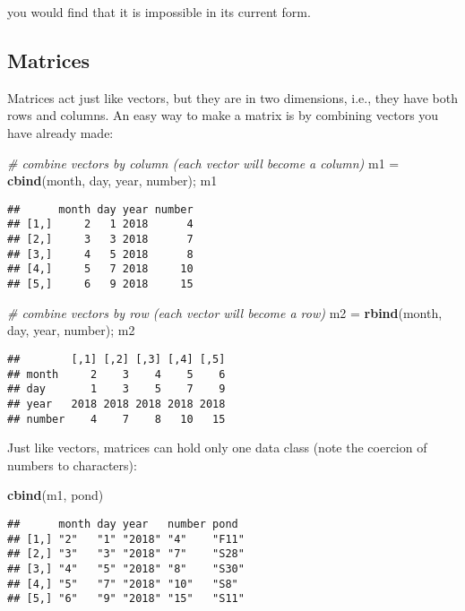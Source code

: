 \documentclass[]{book}
\newenvironment{Shaded}{\begin{snugshade}}{\end{snugshade}}
\newcommand{\KeywordTok}[1]{\textcolor[rgb]{0.13,0.29,0.53}{\textbf{#1}}}
\newcommand{\StringTok}[1]{\textcolor[rgb]{0.31,0.60,0.02}{#1}}
\newcommand{\CommentTok}[1]{\textcolor[rgb]{0.56,0.35,0.01}{\textit{#1}}}
\newcommand{\NormalTok}[1]{#1}
\theoremstyle{definition}
\theoremstyle{definition}
\theoremstyle{definition}
\theoremstyle{remark}
\begin{document}
you would find that it is impossible in its current form.

\subsection{Matrices}\label{matrices}

Matrices act just like vectors, but they are in two dimensions, i.e.,
they have both rows and columns. An easy way to make a matrix is by
combining vectors you have already made:

\begin{Shaded}
\begin{Highlighting}[]
\CommentTok{# combine vectors by column (each vector will become a column)}
\NormalTok{m1 =}\StringTok{ }\KeywordTok{cbind}\NormalTok{(month, day, year, number); m1}
\end{Highlighting}
\end{Shaded}

\begin{verbatim}
##      month day year number
## [1,]     2   1 2018      4
## [2,]     3   3 2018      7
## [3,]     4   5 2018      8
## [4,]     5   7 2018     10
## [5,]     6   9 2018     15
\end{verbatim}

\begin{Shaded}
\begin{Highlighting}[]
\CommentTok{# combine vectors by row (each vector will become a row)}
\NormalTok{m2 =}\StringTok{ }\KeywordTok{rbind}\NormalTok{(month, day, year, number); m2}
\end{Highlighting}
\end{Shaded}

\begin{verbatim}
##        [,1] [,2] [,3] [,4] [,5]
## month     2    3    4    5    6
## day       1    3    5    7    9
## year   2018 2018 2018 2018 2018
## number    4    7    8   10   15
\end{verbatim}

Just like vectors, matrices can hold only one data class (note the
coercion of numbers to characters):

\begin{Shaded}
\begin{Highlighting}[]
\KeywordTok{cbind}\NormalTok{(m1, pond)}
\end{Highlighting}
\end{Shaded}

\begin{verbatim}
##      month day year   number pond 
## [1,] "2"   "1" "2018" "4"    "F11"
## [2,] "3"   "3" "2018" "7"    "S28"
## [3,] "4"   "5" "2018" "8"    "S30"
## [4,] "5"   "7" "2018" "10"   "S8" 
## [5,] "6"   "9" "2018" "15"   "S11"
\end{verbatim}
\end{document}
